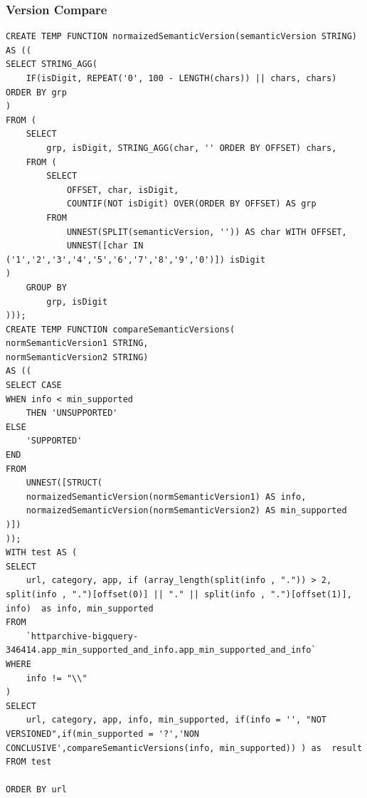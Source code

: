 \subsubsection{Version Compare}
\begin{lstlisting}[caption={Version Compare Query}, label={lst:versioncomparee}]
CREATE TEMP FUNCTION normaizedSemanticVersion(semanticVersion STRING) 
AS ((
SELECT STRING_AGG(
	IF(isDigit, REPEAT('0', 100 - LENGTH(chars)) || chars, chars) ORDER BY grp 
)
FROM (
	SELECT 
		grp, isDigit, STRING_AGG(char, '' ORDER BY OFFSET) chars,
	FROM (
		SELECT 
			OFFSET, char, isDigit,
			COUNTIF(NOT isDigit) OVER(ORDER BY OFFSET) AS grp
		FROM 
			UNNEST(SPLIT(semanticVersion, '')) AS char WITH OFFSET, 
			UNNEST([char IN ('1','2','3','4','5','6','7','8','9','0')]) isDigit
)
	GROUP BY 
		grp, isDigit
)));
CREATE TEMP FUNCTION compareSemanticVersions(
normSemanticVersion1 STRING, 
normSemanticVersion2 STRING) 
AS ((
SELECT CASE 
WHEN info < min_supported 
	THEN 'UNSUPPORTED'
ELSE 
	'SUPPORTED'
END
FROM 
	UNNEST([STRUCT(
	normaizedSemanticVersion(normSemanticVersion1) AS info, 
	normaizedSemanticVersion(normSemanticVersion2) AS min_supported
)])
));
WITH test AS (
SELECT 
	url, category, app, if (array_length(split(info , ".")) > 2, split(info , ".")[offset(0)] || "." || split(info , ".")[offset(1)], info)  as info, min_supported	
FROM 
	`httparchive-bigquery-346414.app_min_supported_and_info.app_min_supported_and_info`
WHERE 
	info != "\\"
)
SELECT 
	url, category, app, info, min_supported, if(info = '', "NOT VERSIONED",if(min_supported = '?','NON CONCLUSIVE',compareSemanticVersions(info, min_supported)) ) as  result
FROM test 

ORDER BY url
\end{lstlisting}

